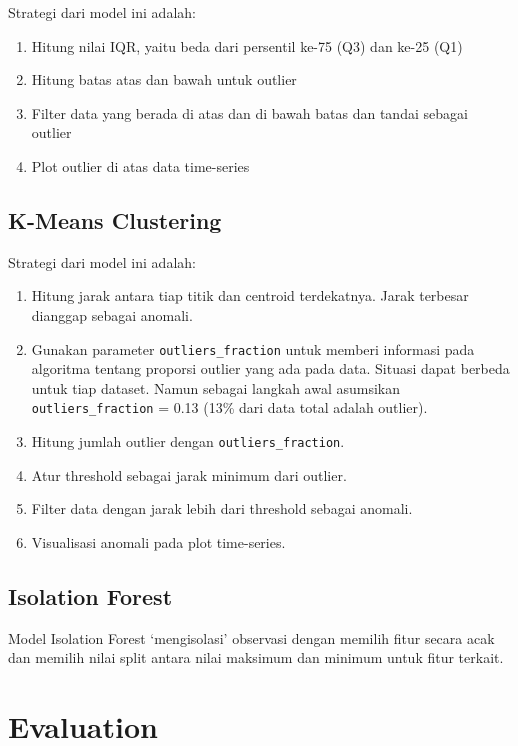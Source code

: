     Strategi dari model ini adalah:

    \begin{enumerate}
        \item Hitung nilai IQR, yaitu beda dari persentil ke-75 (Q3) dan ke-25 (Q1)
        \item Hitung batas atas dan bawah untuk outlier
        \item Filter data yang berada di atas dan di bawah batas dan tandai sebagai outlier
        \item Plot outlier di atas data time-series
    \end{enumerate}

    \subsection{K-Means Clustering}

    Strategi dari model ini adalah:

    \begin{enumerate}
        \item Hitung jarak antara tiap titik dan centroid terdekatnya. Jarak terbesar dianggap sebagai anomali.
        \item Gunakan parameter \texttt{outliers\_fraction} untuk memberi informasi pada algoritma tentang proporsi outlier yang ada pada data. Situasi dapat berbeda untuk tiap dataset. Namun sebagai langkah awal asumsikan \texttt{outliers\_fraction} = 0.13 (13\% dari data total adalah outlier).
        \item Hitung jumlah outlier dengan \texttt{outliers\_fraction}.
        \item Atur threshold sebagai jarak minimum dari outlier.
        \item Filter data dengan jarak lebih dari threshold sebagai anomali.
        \item Visualisasi anomali pada plot time-series.
    \end{enumerate}

    \subsection{Isolation Forest}

    Model Isolation Forest ‘mengisolasi’ observasi dengan memilih fitur secara acak dan memilih nilai split antara nilai maksimum dan minimum untuk fitur terkait.

    \section{Evaluation}

